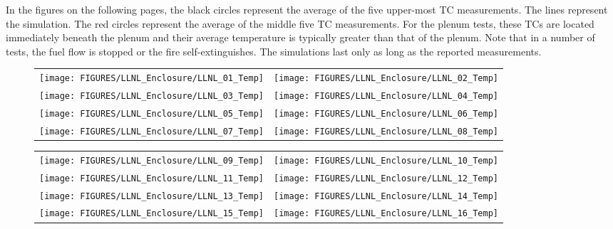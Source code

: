 In the figures on the following pages, the black circles represent the average of the five upper-most TC measurements. The lines represent the simulation.
The red circles represent the average
of the middle five TC measurements. For the plenum tests, these TCs are located immediately beneath the plenum and their average temperature is typically greater
than that of the plenum. Note that in a number of tests, the fuel flow is stopped or the fire self-extinguishes. The simulations last only as long as the
reported measurements.

\begin{figure}[p]
\begin{tabular*}{\textwidth}{l@{\extracolsep{\fill}}r}
\texttt{[image: FIGURES/LLNL\_Enclosure/LLNL\_01\_Temp]} &
\texttt{[image: FIGURES/LLNL\_Enclosure/LLNL\_02\_Temp]} \\
\texttt{[image: FIGURES/LLNL\_Enclosure/LLNL\_03\_Temp]} &
\texttt{[image: FIGURES/LLNL\_Enclosure/LLNL\_04\_Temp]} \\
\texttt{[image: FIGURES/LLNL\_Enclosure/LLNL\_05\_Temp]} &
\texttt{[image: FIGURES/LLNL\_Enclosure/LLNL\_06\_Temp]} \\
\texttt{[image: FIGURES/LLNL\_Enclosure/LLNL\_07\_Temp]} &
\texttt{[image: FIGURES/LLNL\_Enclosure/LLNL\_08\_Temp]}
\end{tabular*}
\label{LLNL_Enclosure_Temp_1}
\end{figure}

\begin{figure}[p]
\begin{tabular*}{\textwidth}{l@{\extracolsep{\fill}}r}
\texttt{[image: FIGURES/LLNL\_Enclosure/LLNL\_09\_Temp]} &
\texttt{[image: FIGURES/LLNL\_Enclosure/LLNL\_10\_Temp]} \\
\texttt{[image: FIGURES/LLNL\_Enclosure/LLNL\_11\_Temp]} &
\texttt{[image: FIGURES/LLNL\_Enclosure/LLNL\_12\_Temp]} \\
\texttt{[image: FIGURES/LLNL\_Enclosure/LLNL\_13\_Temp]} &
\texttt{[image: FIGURES/LLNL\_Enclosure/LLNL\_14\_Temp]} \\
\texttt{[image: FIGURES/LLNL\_Enclosure/LLNL\_15\_Temp]} &
\texttt{[image: FIGURES/LLNL\_Enclosure/LLNL\_16\_Temp]}
\end{tabular*}
\label{LLNL_Enclosure_Temp_2}
\end{figure}

